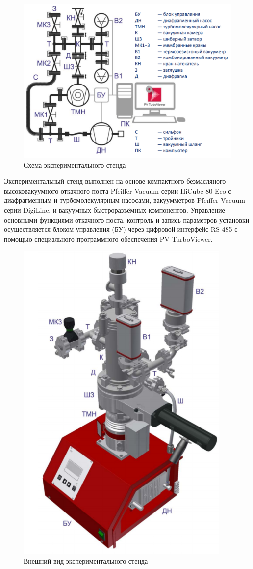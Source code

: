 \documentclass[a4paper, 12pt]{article} %
\begin{document}
\begin{figure}[h]
    \centering
    \includegraphics[width = 13 cm]{7}
    \caption{Схема экспериментального стенда}
    \label{fig:vac}
\end{figure}

Экспериментальный стенд выполнен на основе компактного безмасляного высоковакуумного откачного поста Pfeiffer Vacuum серии HiCube 80 Eco с диафрагменным и турбомолекулярным насосами, вакуумметров Pfeiffer Vacuum серии DigiLine, и вакуумных быстроразъёмных компонентов. Управление основными функциями откачного
поста, контроль и запись параметров установки осуществляется блоком управления (БУ) через цифровой интерфейс RS-485 с помощью специального программного обеспечения PV TurboViewer.

\begin{figure}[h]
    \centering
    \includegraphics[width = 9 cm]{8}
    \caption{Внешний вид экспериментального стенда}
    \label{fig:vac}
\end{figure}
\end{document}
